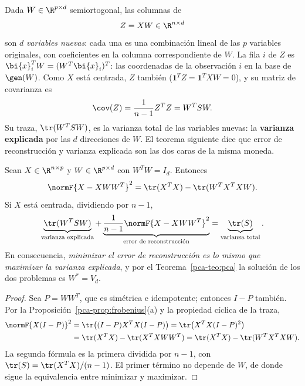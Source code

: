 Dada $W\in\R^{p\times d}$ semiortogonal, las columnas de
\[
Z=XW\in\R^{n\times d}
\]
son $d$ \emph{variables nuevas}: cada una es una combinación lineal de las
$p$ variables originales, con coeficientes en la columna correspondiente de
$W$. La fila $i$ de $Z$ es $\bi{x}_i^T W=(W^T \bi{x}_i)^T$: las
coordenadas de la observación $i$ en la base de $\gen(W)$. Como $X$ está centrada, $Z$ también
($\mathbf 1^T Z=\mathbf 1^T XW=0$), y su matriz de covarianza es
\[
\cov(Z)=\frac{1}{n-1}Z^T Z=W^T SW .
\]
Su traza, $\tr(W^T SW)$, es la varianza total de las variables nuevas: la
\textbf{varianza explicada} por las $d$ direcciones de $W$. El teorema
siguiente dice que error de reconstrucción y varianza explicada son las dos
caras de la misma moneda.

\begin{theorem}[Error de reconstrucción $=$ varianza total $-$ varianza explicada]\label{pca-teo:traza-error}
Sean $X\in\R^{n\times p}$ y $W\in\R^{p\times d}$ con $W^T W=I_d$. Entonces
\begin{equation}\label{pca-eq:traza-error}
\normF{X-XWW^T}^2=\tr(X^T X)-\tr(W^T X^T XW).
\end{equation}
Si $X$ está centrada, dividiendo por $n-1$,
\begin{equation}\label{pca-eq:descomposicion-varianza}
\underbrace{\tr(W^T SW)}_{\text{varianza explicada}}
+\underbrace{\frac{1}{n-1}\normF{X-XWW^T}^2}_{\text{error de reconstrucción}}
=\underbrace{\tr(S)}_{\text{varianza total}} .
\end{equation}
En consecuencia, \emph{minimizar el error de reconstrucción es lo mismo que
maximizar la varianza explicada}, y por el Teorema~\ref{pca-teo:pca} la
solución de los dos problemas es $W^\ast=V_d$.
\end{theorem}

\begin{proof}
Sea $P=WW^T$, que es simétrica e idempotente; entonces $I-P$ también.
Por la Proposición~\ref{pca-prop:frobenius}(a) y la propiedad cíclica de la
traza,
\begin{align*}
\normF{X(I-P)}^2
&=\tr\bigl((I-P)X^T X(I-P)\bigr)
=\tr\bigl(X^T X(I-P)^2\bigr)\\
&=\tr(X^T X)-\tr(X^T XWW^T)
=\tr(X^T X)-\tr(W^T X^T XW).
\end{align*}
La segunda fórmula es la primera dividida por $n-1$, con
$\tr(S)=\tr(X^T X)/(n-1)$. El primer término no depende de $W$, de
donde sigue la equivalencia entre minimizar y maximizar.
\end{proof}

